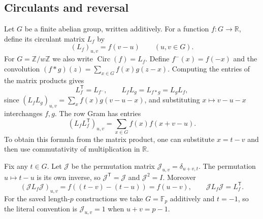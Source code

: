 \documentclass[10pt]{article}
\newcommand{\F}{\mathbb F}
\newcommand{\Circ}{\operatorname{Circ}}
\begin{document}
\subsection{Circulants and reversal}
Let $G$ be a finite abelian group, written additively. For a function
$f\colon G\to\mathbb R$, define its circulant matrix $L_f$ by
\[
 (L_f)_{u,v}=f(v-u)\qquad(u,v\in G).
\]
For $G=\mathbb Z/w\mathbb Z$ we also write $\Circ(f)=L_f$.
Define $f^-(x)=f(-x)$ and the convolution
$(f*g)(z)=\sum_{x\in G}f(x)g(z-x)$.
Computing the entries of the matrix products gives
\[
 L_f^{\mathsf T}=L_{f^-},\qquad
 L_fL_g=L_{f*g}=L_gL_f,
\]
since $(L_fL_g)_{u,v}=\sum_x f(x)g(v-u-x)$, and substituting
$x\mapsto v-u-x$ interchanges $f,g$.
The row Gram has entries
\begin{equation}\label{eq:circulant-gram}
 (L_fL_f^{\mathsf T})_{u,v}
 =\sum_{x\in G}f(x)f(x+v-u).
\end{equation}
To obtain this formula from the matrix product, one can substitute
$x=t-v$ and then use commutativity of multiplication in $\mathbb R$.

Fix any $t\in G$. Let $\mathcal J$ be the permutation matrix
$\mathcal J_{u,v}=\delta_{u+v,t}$. The permutation $u\mapsto t-u$ is its own inverse,
so $\mathcal J^{\mathsf T}=\mathcal J$ and $\mathcal J^2=I$. Moreover
\[
 (\mathcal JL_f\mathcal J)_{u,v}=f((t-v)-(t-u))=f(u-v),
 \qquad \mathcal JL_f\mathcal J=L_f^{\mathsf T}.
\]
For the saved length-$p$ constructions we take $G=\F_p$ additively and
$t=-1$, so the literal convention is $\mathcal J_{u,v}=1$ when $u+v=p-1$.
\end{document}
